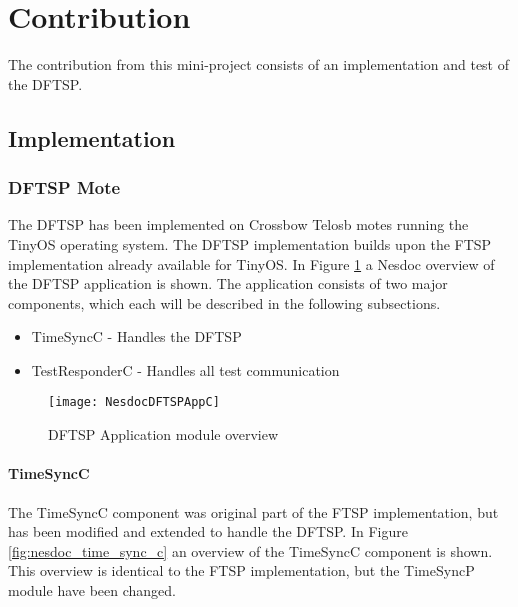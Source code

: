 \documentclass[Main]{subfiles}
\begin{document}
\section{Contribution} %
\label{sec:contribution}

	The contribution from this mini-project consists of an implementation and test of the DFTSP.
	\subsection{Implementation} %
	\label{sub:implementation}

		\subsubsection{DFTSP Mote} %
		\label{sub:dftsp_mote}
			The DFTSP has been implemented on Crossbow Telosb motes\cite{TelosBDatasheet:Online} running the TinyOS\cite{TinyOS:Online} operating system. 
			The DFTSP implementation builds upon the FTSP implementation already available for TinyOS\cite{FTSPImplementationTinyOS:Online}.
			In Figure \ref{fig:nesdoc_dstfp_app_c} a Nesdoc\cite{Nesdoc:Online} overview of the DFTSP application is shown. 
			The application consists of two major components, which each will be described in the following subsections.
			
			\begin{itemize}
			 	\item TimeSyncC - Handles the DFTSP
			 	\item TestResponderC - Handles all test communication
			\end{itemize}

			\begin{figure}[H]
				\centering
				\texttt{[image: NesdocDFTSPAppC]}
				\caption{DFTSP Application module overview}
				\label{fig:nesdoc_dstfp_app_c}
			\end{figure}

			\paragraph{TimeSyncC} %
			\label{par:timesyncc}
				The TimeSyncC component was original part of the FTSP implementation, but has been modified and extended to handle the DFTSP.
				In Figure \ref{fig:nesdoc_time_sync_c} an overview of the TimeSyncC component is shown.
				This overview is identical to the FTSP implementation, but the TimeSyncP module have been changed.
\end{document}
